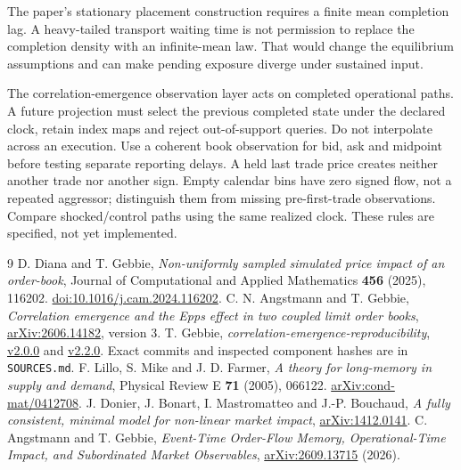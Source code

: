 \documentclass[11pt,a4paper]{article}
\begin{document}
The paper's stationary placement construction requires a finite mean
completion lag. A heavy-tailed transport waiting time is not permission to
replace the completion density with an infinite-mean law. That would change
the equilibrium assumptions and can make pending exposure diverge under
sustained input.

The correlation-emergence observation layer acts on completed operational
paths. A future projection must select the previous completed state under
the declared clock, retain index maps and reject out-of-support queries.
Do not interpolate across an execution. Use a coherent book observation for
bid, ask and midpoint before testing separate reporting delays. A held last
trade price creates neither another trade nor another sign. Empty calendar
bins have zero signed flow, not a repeated aggressor; distinguish them from
missing pre-first-trade observations. Compare shocked/control paths using
the same realized clock. These rules are specified, not yet implemented.

\begin{thebibliography}{9}\small
{} D. Diana and T. Gebbie, \emph{Non-uniformly sampled simulated
price impact of an order-book}, Journal of Computational and Applied
Mathematics \textbf{456} (2025), 116202.
\href{https://doi.org/10.1016/j.cam.2024.116202}{doi:10.1016/j.cam.2024.116202}.
 C. N. Angstmann and T. Gebbie, \emph{Correlation emergence and
the Epps effect in two coupled limit order books},
\href{https://arxiv.org/abs/2606.14182}{arXiv:2606.14182}, version 3.
 T. Gebbie, \emph{correlation-emergence-reproducibility},
\href{https://github.com/timgebbie/correlation-emergence-reproducibility/releases/tag/v2.0.0}{v2.0.0}
and \href{https://github.com/timgebbie/correlation-emergence-reproducibility/releases/tag/v2.2.0}{v2.2.0}.
Exact commits and inspected component hashes are in \texttt{SOURCES.md}.
 F. Lillo, S. Mike and J. D. Farmer, \emph{A theory for
long-memory in supply and demand}, Physical Review E \textbf{71} (2005),
066122. \href{https://arxiv.org/abs/cond-mat/0412708}{arXiv:cond-mat/0412708}.
 J. Donier, J. Bonart, I. Mastromatteo and J.-P. Bouchaud,
\emph{A fully consistent, minimal model for non-linear market impact},
\href{https://arxiv.org/abs/1412.0141}{arXiv:1412.0141}.
 C. Angstmann and T. Gebbie, \emph{Event-Time Order-Flow
Memory, Operational-Time Impact, and Subordinated Market Observables},
\href{https://arxiv.org/abs/2609.13715}{arXiv:2609.13715} (2026).
\end{thebibliography}
\end{document}
